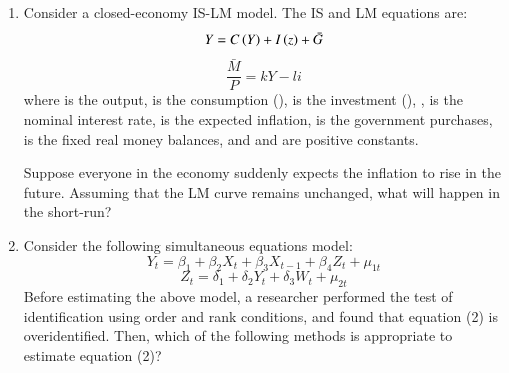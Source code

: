 \documentclass[12pt]{article}
\theoremstyle{remark}
\begin{document}
\begin{enumerate}
\begin{enumerate}
 \end{enumerate}
\hfill{}
\item  Consider a closed-economy IS-LM model. The IS and LM equations are:
$$
Y = C \left(Y\right) + I \left(z\right) + \bar{G}
$$
$$
\frac{\bar{M}}{P} = kY - li
$$
where  is the output,  is the consumption (),  is the investment (), ,  is the nominal interest rate,  is the expected inflation,  is the government purchases,  is the fixed real money balances, and  and  are positive constants. 

Suppose everyone in the economy suddenly expects the inflation to rise in the future. Assuming that the LM curve remains unchanged, what will happen in the short-run? \\
\begin{enumerate}  \end{enumerate}
\hfill{}
\item Consider the following simultaneous equations model:
$$
Y_t = \beta_1 + \beta_2 X_t + \beta_3 X_{t-1} + \beta_4 Z_t + \mu_{1t} 
$$
$$
Z_t = \delta_1 + \delta_2 Y_t + \delta_3 W_t + \mu_{2t} 
$$
Before estimating the above model, a researcher performed the test of identification using order and rank conditions, and found that equation (2) is overidentified. Then, which of the following methods is appropriate to estimate equation (2)? \\
\begin{enumerate}  \end{enumerate}

\end{enumerate}
\end{document}
